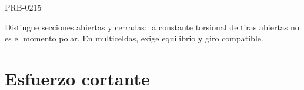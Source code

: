 \begin{studiumworked}{PRB-0215}
\begin{minipage}{\linewidth}
\begin{tcolorbox}[studiumcheck,breakable=false,title={Síntesis y comprobación}]Distingue secciones abiertas y cerradas: la constante torsional de tiras abiertas no es el momento polar. En multiceldas, exige equilibrio y giro compatible.\end{tcolorbox}

\end{minipage}

\end{studiumworked}

\chapter{Esfuerzo cortante}


\Needspace{.3\textheight}

